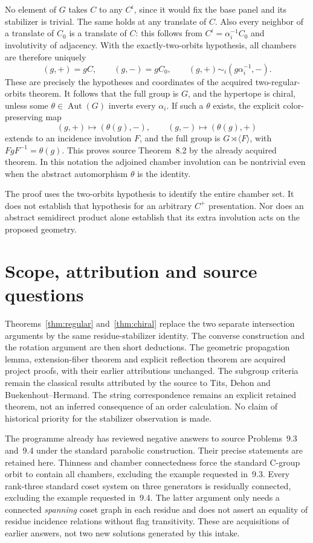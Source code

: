 \documentclass[11pt,a4paper]{article}
\newcommand{\gen}[1]{\langle#1\rangle}
\newcommand{\Aut}{\operatorname{Aut}}
\begin{document}
No element of $G$ takes $C$ to any $C^i$, since it would fix the base
panel and its stabilizer is trivial.  The same holds at any translate
of $C$.  Also every neighbor of a translate of $C_0$ is a translate
of $C$: this follows from $C^i=\alpha_i^{-1}C_0$ and involutivity
of adjacency.  With the exactly-two-orbits hypothesis, all chambers
are therefore uniquely
\[
       (g,+)=gC,\qquad(g,-)=gC_0,
       \qquad (g,+)\sim_i(g\alpha_i^{-1},-).
\]
These are precisely the hypotheses and coordinates of the acquired
two-regular-orbits theorem.  It follows that the full group is $G$, and
the hypertope is chiral, unless some $\theta\in\Aut(G)$ inverts every
$\alpha_i$.  If such a $\theta$ exists, the explicit color-preserving map
\[
       (g,+)\mapsto(\theta(g),-),\qquad
       (g,-)\mapsto(\theta(g),+)
\]
extends to an incidence involution $F$, and the full group is
$G\rtimes\gen{F}$, with $FgF^{-1}=\theta(g)$.  This proves source
Theorem~8.2 by the already acquired theorem.  In this notation the
adjoined chamber involution can be nontrivial even when the abstract
automorphism $\theta$ is the identity.

The proof uses the two-orbits hypothesis to identify the entire chamber
set.  It does not establish that hypothesis for an arbitrary $C^+$
presentation.  Nor does an abstract semidirect product alone establish
that its extra involution acts on the proposed geometry.

\section{Scope, attribution and source questions}

Theorems~\ref{thm:regular} and~\ref{thm:chiral} replace the two separate
intersection arguments by the same residue-stabilizer identity.
The converse construction and the rotation argument are then short
deductions.  The geometric propagation lemma, extension-fiber theorem
and explicit reflection theorem are acquired project proofs, with their
earlier attributions unchanged.  The subgroup criteria remain the
classical results attributed by the source to Tits, Dehon and
Buekenhout--Hermand.  The string correspondence remains an explicit
retained theorem, not an inferred consequence of an order calculation.
No claim of historical priority for the stabilizer observation is made.

The programme already has reviewed negative answers to source
Problems~9.3 and~9.4 under the standard parabolic construction.  Their
precise statements are retained here.  Thinness and chamber connectedness
force the standard C-group orbit to contain all chambers, excluding the
example requested in~9.3.  Every rank-three standard coset system on
three generators is residually connected, excluding the example requested
in~9.4.  The latter argument only needs a connected \emph{spanning}
coset graph in each residue and does not assert an equality of residue
incidence relations without flag transitivity.  These are acquisitions
of earlier answers, not two new solutions generated by this intake.
\end{document}

